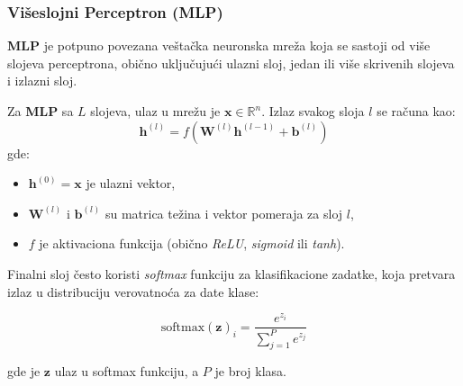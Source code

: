 \documentclass[12pt]{article}
\begin{document}
   \newpage
   \subsubsection*{Višeslojni Perceptron (MLP)}
   \textbf{MLP} je potpuno povezana veštačka neuronska mreža koja se sastoji od više 
   slojeva perceptrona, obično uključujući ulazni sloj, jedan ili više skrivenih slojeva i 
   izlazni sloj.

   Za \textbf{MLP} sa \(L\) slojeva, ulaz u mrežu je \(\mathbf{x} \in \mathbb{R}^n\). 
   Izlaz svakog sloja \(l\) se računa kao:
   \[
   \mathbf{h}^{(l)} = f(\mathbf{W}^{(l)} \mathbf{h}^{(l-1)} + \mathbf{b}^{(l)})
   \]
   gde:
   \vspace{-0.5cm}
   \begin{itemize}
      \item \(\mathbf{h}^{(0)} = \mathbf{x}\) je ulazni vektor,
      \item\(\mathbf{W}^{(l)}\) i \(\mathbf{b}^{(l)}\) su matrica težina i vektor pomeraja za sloj \(l\),
      \item \(f\) je aktivaciona funkcija (obično \textit{ReLU}, \textit{sigmoid} ili \textit{tanh}).
   \end{itemize}

   Finalni sloj često koristi \textit{softmax} funkciju za klasifikacione zadatke, koja pretvara 
   izlaz u distribuciju verovatnoća za date klase:

   \[
   \text{softmax}(\mathbf{z})_i = \frac{e^{z_i}}{\sum_{j=1}^P e^{z_j}}
   \]

   gde je \(\mathbf{z}\) ulaz u softmax funkciju, a \(P\) je broj klasa.
   \vspace{0.5cm}
\end{document}
